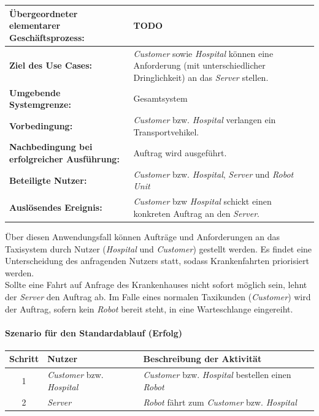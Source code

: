			\begin{table}[H]
				\centering
				\begin{tabularx}{\textwidth}{|p{5cm}|X|}
					\hline
					\textbf{Übergeordneter elementarer Geschäftsprozess:} & TODO  \\ \hline
					\textbf{Ziel des Use Cases:} & \emph{Customer} sowie \emph{Hospital} können eine Anforderung (mit unterschiedlicher Dringlichkeit) an das \emph{Server} stellen. \\ \hline
					\textbf{Umgebende Systemgrenze:} & Gesamtsystem \\ \hline
					\textbf{Vorbedingung:} & \emph{Customer} bzw. \emph{Hospital} verlangen ein Transportvehikel. \\ \hline
					\textbf{Nachbedingung bei erfolgreicher Ausführung:} & Auftrag wird ausgeführt. \\ \hline
					\textbf{Beteiligte Nutzer:} & \emph{Customer} bzw. \emph{Hospital}, \emph{Server} und \emph{Robot Unit} \\ \hline
					\textbf{Auslösendes Ereignis:} & \emph{Customer} bzw \emph{Hospital} schickt einen konkreten Auftrag an den \emph{Server}. \\
					\hline
				\end{tabularx}
			\end{table}
			
			Über diesen Anwendungsfall können Aufträge und Anforderungen an das Taxisystem durch Nutzer (\emph{Hospital} und \emph{Customer}) gestellt werden.
			Es findet eine Unterscheidung des anfragenden Nutzers statt, sodass Krankenfahrten priorisiert werden. \\ Sollte eine Fahrt auf Anfrage des Krankenhauses nicht sofort möglich sein, lehnt der \emph{Server} den Auftrag ab. Im Falle eines normalen Taxikunden (\emph{Customer}) wird der Auftrag, sofern kein \emph{Robot} bereit steht, in eine Warteschlange eingereiht.
			
				\paragraph*{Szenario für den Standardablauf (Erfolg)}
	
				\begin{table}[H]
					\centering
					\begin{tabularx}{\textwidth}{|c|p{2cm}|X|}
					\hline
					Schritt & Nutzer & Beschreibung der Aktivität \\ \hline
					1 & \emph{Customer} bzw. \emph{Hospital}  & \emph{Customer} bzw. \emph{Hospital} bestellen einen \emph{Robot} \\
					2 & \emph{Server} & \emph{Robot} fährt zum \emph{Customer} bzw. \emph{Hospital}  \\
					\hline
					\end{tabularx}
				\end{table}
